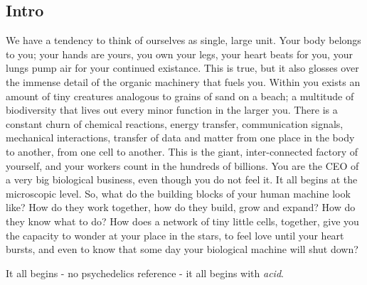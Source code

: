 \subsection{Intro}
We have a tendency to think of ourselves as single, large unit. 
Your body belongs to you; your hands are yours, you own your legs, your heart beats for you, your lungs pump air for your continued existance. 
This is true, but it also glosses over the immense detail of the organic machinery that fuels you.
Within you exists an amount of tiny creatures analogous to grains of sand on a beach; a multitude of biodiversity that lives out every minor function in the larger you. There is a constant churn of chemical reactions, energy transfer, communication signals, mechanical interactions, transfer of data and matter from one place in the body to another, from one cell to another. This is the giant, inter-connected factory of yourself, and your workers count in the hundreds of billions. You are the CEO of a very big biological business, even though you do not feel it.
It all begins at the microscopic level. So, what do the building blocks of your human machine look like? How do they work together, how do they build, grow and expand? How do they know what to do? How does a network of tiny little cells, together, give you the capacity to wonder at your place in the stars, to feel love until your heart bursts, and even to know that some day your biological machine will shut down?

It all begins - no psychedelics reference - it all begins with \emph{acid}. 
